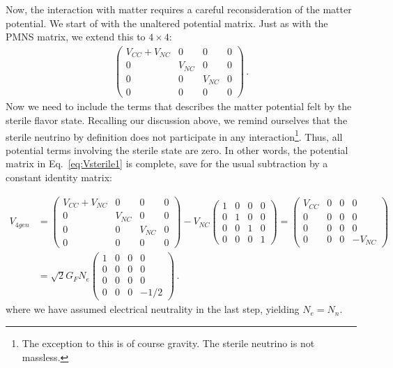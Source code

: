 Now, the interaction with matter requires a careful reconsideration of the matter potential. We start of with the unaltered potential matrix. 
Just as with the PMNS matrix, we extend this to $4\times4$:
\begin{align}\label{eq:Vsterile1}
    \begin{pmatrix}
        V_{CC} + V_{NC} & 0 & 0 & 0 \\
        0 &V_{NC} & 0 & 0 \\
        0 & 0 & V_{NC} & 0 \\
        0 & 0 & 0 & 0 
    \end{pmatrix}\,.
\end{align}
Now we need to include the terms that describes the matter potential felt by the sterile flavor state. Recalling our discussion above, we remind ourselves that the sterile neutrino by definition
does not participate in any interaction\footnote{The exception to this is of course gravity. The sterile neutrino is not massless.}. Thus, all potential terms involving the sterile state are zero. 
In other words, the potential matrix in Eq.~\ref{eq:Vsterile1} is complete, save for the usual subtraction by a constant identity matrix:

\begin{align}\label{eq:Vsterile}
    V_{4gen} &=
    \begin{pmatrix}
        V_{CC} + V_{NC} & 0 & 0 & 0 \\
        0 &V_{NC} & 0 & 0 \\
        0 & 0 & V_{NC} & 0 \\
        0 & 0 & 0 & 0 
    \end{pmatrix} - V_{NC}\begin{pmatrix}
        1 & 0 & 0 & 0 \\
        0 &1 & 0 & 0 \\
        0 & 0 & 1 & 0 \\
        0 & 0 & 0 & 1 
    \end{pmatrix}
    = \begin{pmatrix}
        V_{CC} & 0 & 0 & 0 \\
        0 &0 & 0 & 0 \\
        0 & 0 & 0 & 0 \\
        0 & 0 & 0 & -V_{NC}
    \end{pmatrix} \nonumber \\
    &=\sqrt{2}G_F N_e\begin{pmatrix}
        1 & 0 & 0 & 0 \\
        0 &0 & 0 & 0 \\
        0 & 0 & 0 & 0 \\
        0 & 0 & 0 & -1/2
    \end{pmatrix}\,.
\end{align}
where we have assumed electrical neutrality in the last step, yielding $N_e = N_n$.

